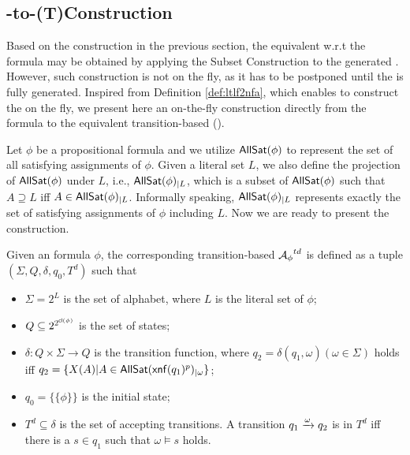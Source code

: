 \subsection{\ltlf-to-(T)\DFA Construction}

Based on the \NFA construction in the previous section, the equivalent \DFA w.r.t the \ltlf formula may be obtained by applying the Subset Construction to the generated \NFA. However, such \DFA construction is not on the fly, as it has to be postponed until the \NFA is fully generated. Inspired from Definition \ref{def:ltlf2nfa}, which enables to construct the \TNFA on the fly, we present here an on-the-fly construction directly from the \ltlf formula to the equivalent transition-based \DFA (\TDFA). 

Let $\phi$ be a propositional formula and we utilize ${\sf AllSat}(\phi)$ to represent the set of all satisfying assignments of $\phi$. Given a literal set $L$, we also define the projection of ${\sf AllSat}(\phi)$ under $L$, i.e., ${\sf AllSat}(\phi)_{|L}$, which is a subset of ${\sf AllSat}(\phi)$ such that $A\supseteq L$ iff $A\in {\sf AllSat}(\phi)_{|L}$. Informally speaking, ${\sf AllSat}(\phi)_{|L}$ represents exactly the set of satisfying assignments of $\phi$ including $L$. Now we are ready to present the \TDFA construction. 

\begin{definition}\label{def:ltlf2dfa}
Given an \ltlf formula $\phi$, the corresponding transition-based \DFA ${\mathcal{A}_{\phi}}^{td}$ is defined as a tuple $(\Sigma, Q, \delta, q_0, T^d)$ such that
\begin{itemize}
	\item $\Sigma = 2^{L}$ is the set of alphabet, where $L$ is the literal set of $\phi$;
	\item $Q\subseteq 2^{2^{{\sf cl}(\phi)}}$ is the set of states;
	\item $\delta:  Q \times \Sigma \to Q$ is the transition function, where $q_2 = \delta(q_1, \omega) (\omega \in \Sigma)$ holds iff $q_2=\{X(A) | A\in{\sf AllSat}({\sf xnf}(q_1)^p)_{|\omega}\}$;
	\item $q_0 = \{\{\phi \}\}$ is the initial state;
	\item $T^d\subseteq \delta$ is the set of accepting transitions. A transition $q_1\xrightarrow[]{\omega}q_2$ is in $T^d$ iff there is a $s\in q_1$ such that $\omega\models s$ holds. 
\end{itemize}

\end{definition}

